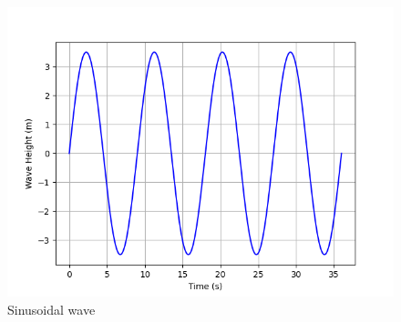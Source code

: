 \documentclass[journal,12pt,onecolumn]{IEEEtran}
\theoremstyle{remark}
\begin{document}
\begin{figure}[h]
    \centering
    \includegraphics[width=\columnwidth]{figs/plot.png}
    \caption{Sinusoidal wave}
    \label{fig:}
\end{figure} 

\end{document}
